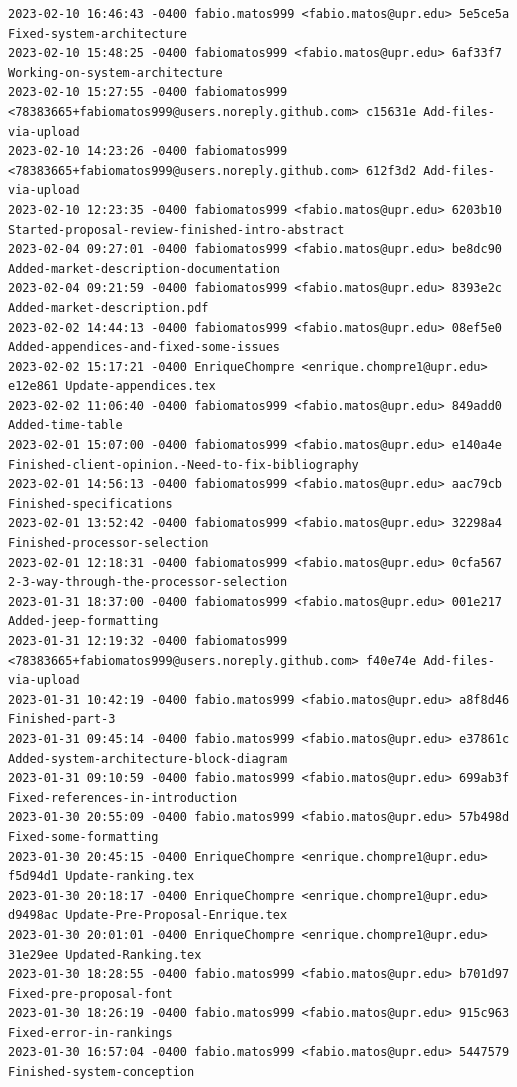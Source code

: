 \documentclass[12pt]{article}
\begin{document}
\begin{lstlisting}
2023-02-10 16:46:43 -0400 fabio.matos999 <fabio.matos@upr.edu> 5e5ce5a Fixed-system-architecture
2023-02-10 15:48:25 -0400 fabiomatos999 <fabio.matos@upr.edu> 6af33f7 Working-on-system-architecture
2023-02-10 15:27:55 -0400 fabiomatos999 <78383665+fabiomatos999@users.noreply.github.com> c15631e Add-files-via-upload
2023-02-10 14:23:26 -0400 fabiomatos999 <78383665+fabiomatos999@users.noreply.github.com> 612f3d2 Add-files-via-upload
2023-02-10 12:23:35 -0400 fabiomatos999 <fabio.matos@upr.edu> 6203b10 Started-proposal-review-finished-intro-abstract
2023-02-04 09:27:01 -0400 fabiomatos999 <fabio.matos@upr.edu> be8dc90 Added-market-description-documentation
2023-02-04 09:21:59 -0400 fabiomatos999 <fabio.matos@upr.edu> 8393e2c Added-market-description.pdf
2023-02-02 14:44:13 -0400 fabiomatos999 <fabio.matos@upr.edu> 08ef5e0 Added-appendices-and-fixed-some-issues
2023-02-02 15:17:21 -0400 EnriqueChompre <enrique.chompre1@upr.edu> e12e861 Update-appendices.tex
2023-02-02 11:06:40 -0400 fabiomatos999 <fabio.matos@upr.edu> 849add0 Added-time-table
2023-02-01 15:07:00 -0400 fabiomatos999 <fabio.matos@upr.edu> e140a4e Finished-client-opinion.-Need-to-fix-bibliography
2023-02-01 14:56:13 -0400 fabiomatos999 <fabio.matos@upr.edu> aac79cb Finished-specifications
2023-02-01 13:52:42 -0400 fabiomatos999 <fabio.matos@upr.edu> 32298a4 Finished-processor-selection
2023-02-01 12:18:31 -0400 fabiomatos999 <fabio.matos@upr.edu> 0cfa567 2-3-way-through-the-processor-selection
2023-01-31 18:37:00 -0400 fabiomatos999 <fabio.matos@upr.edu> 001e217 Added-jeep-formatting
2023-01-31 12:19:32 -0400 fabiomatos999 <78383665+fabiomatos999@users.noreply.github.com> f40e74e Add-files-via-upload
2023-01-31 10:42:19 -0400 fabio.matos999 <fabio.matos@upr.edu> a8f8d46 Finished-part-3
2023-01-31 09:45:14 -0400 fabio.matos999 <fabio.matos@upr.edu> e37861c Added-system-architecture-block-diagram
2023-01-31 09:10:59 -0400 fabio.matos999 <fabio.matos@upr.edu> 699ab3f Fixed-references-in-introduction
2023-01-30 20:55:09 -0400 fabio.matos999 <fabio.matos@upr.edu> 57b498d Fixed-some-formatting
2023-01-30 20:45:15 -0400 EnriqueChompre <enrique.chompre1@upr.edu> f5d94d1 Update-ranking.tex
2023-01-30 20:18:17 -0400 EnriqueChompre <enrique.chompre1@upr.edu> d9498ac Update-Pre-Proposal-Enrique.tex
2023-01-30 20:01:01 -0400 EnriqueChompre <enrique.chompre1@upr.edu> 31e29ee Updated-Ranking.tex
2023-01-30 18:28:55 -0400 fabio.matos999 <fabio.matos@upr.edu> b701d97 Fixed-pre-proposal-font
2023-01-30 18:26:19 -0400 fabio.matos999 <fabio.matos@upr.edu> 915c963 Fixed-error-in-rankings
2023-01-30 16:57:04 -0400 fabio.matos999 <fabio.matos@upr.edu> 5447579 Finished-system-conception

\end{lstlisting}
\end{document}
